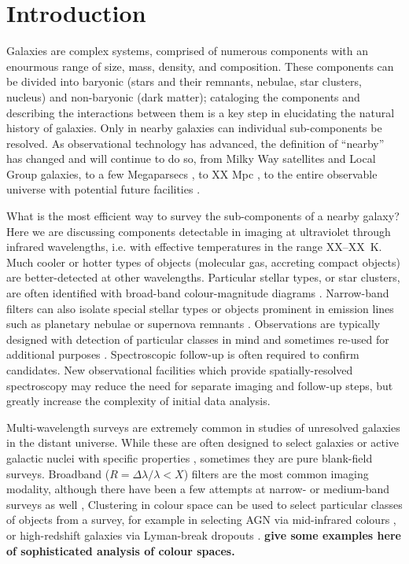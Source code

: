 
\section{Introduction}


Galaxies are complex systems, comprised of numerous components with an enourmous range of size,
mass, density, and composition.
These components can be divided into baryonic (stars and their remnants,
nebulae, star clusters, nucleus) and non-baryonic (dark matter);
cataloging the components and describing
the interactions between them is a key step in elucidating the natural history of galaxies.
Only in nearby galaxies can individual sub-components be resolved.
As observational technology has advanced,
the definition of ``nearby'' has changed and will continue to do so, from Milky Way satellites and Local Group galaxies, to a few
Megaparsecs \citep[distance at which stars can be resolved with HST][]{},
to XX Mpc \citep[distance at which stars can be resolved with JWST][]{},
to the entire observable universe with potential future facilities \citep{}.

What is the most efficient way to survey the sub-components of a nearby galaxy?
Here we are discussing components detectable in imaging at ultraviolet through infrared wavelengths,
i.e. with effective temperatures in the range XX--XX~K.
Much cooler or hotter types of objects (molecular gas, accreting compact objects) are better-detected at other wavelengths.
Particular stellar types, or star clusters, are often identified with broad-band colour-magnitude diagrams \citep[e.g.][]{}.
Narrow-band filters can also isolate special stellar types \citep[e.g.][]{} or objects prominent in emission
lines such as planetary nebulae or supernova remnants \citep[e.g.][]{}.
Observations are typically designed with detection of particular classes in mind and sometimes re-used for additional purposes \citep[e.g.][]{}.
Spectroscopic follow-up is often required to confirm candidates.
New observational facilities which provide spatially-resolved spectroscopy  \citep[e.g.]{}{} may reduce the need for separate imaging and follow-up steps,
but greatly increase the complexity of initial data analysis.


Multi-wavelength surveys are extremely common in studies of unresolved galaxies in the distant universe.
While these are often designed to select galaxies or active galactic nuclei with specific properties \citep[e.g.][]{},
sometimes they are pure blank-field surveys.
Broadband ($R=\Delta \lambda/\lambda < X$) filters are the most common imaging modality,
although there have been a few attempts at narrow- or medium-band surveys as well \citep[e.g.][]{combo-17},
Clustering in colour space can be used to select particular classes of objects from a survey,
for example in selecting AGN via mid-infrared colours \citep[e.g.][]{},
or high-redshift galaxies via Lyman-break dropouts \citep[e.g.][]{}. 
{\bf give some examples here of sophisticated analysis of colour spaces.}

